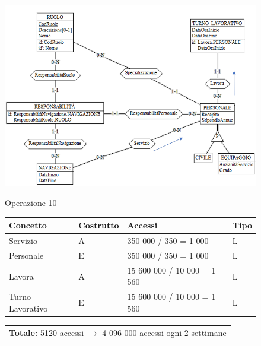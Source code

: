 \documentclass[a4paper, titlepage]{report}
\begin{document}
	 \vspace{0.5cm}
	\begin{figure}[h]
		\centering
		\includegraphics[scale=0.7]{images/SchNav03.png}		
	\end{figure}
	\vspace{0.5cm}
	\begin{figure}[h]
		\centering
		Operazione 10\\
		\begin{tabular}{L{3cm}C{2.5cm}C{4.5cm}C{2.5cm}}
			\rule[-2mm]{0mm}{0.65cm}{}
			\textbf{Concetto} & \textbf{Costrutto} &\textbf{Accessi} & \textbf{Tipo} \\
			\hline\rule[-2mm]{0mm}{0.65cm}{}
			Servizio & A & 350 000 / 350 = 1 000 & L \\
			\hline\rule[-2mm]{0mm}{0.65cm}{}
			Personale & E & 350 000 / 350 = 1 000 & L \\
			\hline\rule[-2mm]{0mm}{0.65cm}{}
			Lavora & A & 15 600 000 / 10 000 = 1 560 & L \\
			\hline\rule[-2mm]{0mm}{0.65cm}{}
			Turno Lavorativo & E & 15 600 000 / 10 000 = 1 560 & L \\
		\end{tabular}
		\begin{tabular}{C{13.9cm}}
			\rule[-4mm]{0mm}{1cm}{}	
			 \textbf{Totale:} 5120 accessi $\to$ 4 096 000 accessi ogni 2 settimane
		\end{tabular}
	\end{figure}
	
\end{document}

